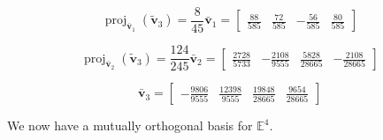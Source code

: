 \documentclass{tufte-book}
\DeclareMathOperator{\proj}{proj}
\newcommand{\vct}{\mathbf}
\theoremstyle{mytheoremstyle}
\theoremstyle{mylemstyle}
\theoremstyle{mydefstyle}
\begin{document}
\[
\proj_{\vct{\bar{v}}_1}(\vct{\tilde{v}}_3) = \frac{8}{45}\vct{\bar{v}}_1 =
\begin{bmatrix}
\frac{88}{585} & \frac{72}{585} & -\frac{56}{585} & \frac{80}{585}
\end{bmatrix}
\]

\[
\proj_{\vct{\bar{v}}_2}(\vct{\tilde{v}}_3) = \frac{124}{245}\vct{\bar{v}}_2 =
\begin{bmatrix}
\frac{2728}{5733} & -\frac{2108}{9555} & \frac{5828}{28665} & -\frac{2108}{28665}
\end{bmatrix}
\]

\[
\vct{\bar{v}}_3 =
\begin{bmatrix}
-\frac{9806}{9555} & \frac{12398}{9555} & \frac{19848}{28665} & \frac{9654}{28665}
\end{bmatrix}
\]

We now have a mutually orthogonal basis for $\mathbb{E}^4$.
\end{document}
